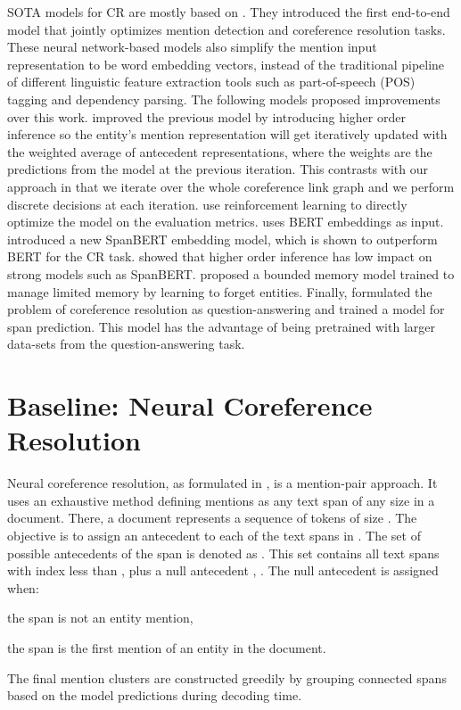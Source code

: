 \documentclass[11pt]{article}
\begin{document}
SOTA models for CR are mostly based on \citet{lee-etal-2017-end}. They introduced the first end-to-end model that jointly optimizes mention detection and coreference resolution tasks. These neural network-based models also simplify the mention input representation to be word embedding vectors, instead of the traditional pipeline of different linguistic feature extraction tools such as part-of-speech (POS) tagging and dependency parsing. The following models proposed improvements over this work.  \cite{lee-etal-2018-higher} improved the previous model by introducing higher order inference so the entity's mention representation will get iteratively updated with the weighted average of antecedent representations, where the weights are the predictions from the model at the previous iteration. This contrasts with our approach in that we iterate over the whole coreference link graph and we perform discrete decisions at each iteration. \citet{fei-etal-2019-end} use reinforcement learning to directly optimize the model on the evaluation metrics. \citet{joshi-etal-2019-bert} uses BERT embeddings \cite{devlin-etal-2019-bert} as input. \citet{joshi-etal-2020-spanbert} introduced a new SpanBERT embedding model, which is shown to outperform BERT for the CR task. \citet{xu-choi-2020-revealing} showed that higher order inference has low impact on strong models such as SpanBERT.  \citet{toshniwal-etal-2020-learning} proposed a bounded memory model trained to manage limited memory by learning to forget entities. Finally, \citet{wu-etal-2020-corefqa} formulated the problem of coreference resolution as question-answering and trained a model for span prediction. This model has the advantage of being pretrained with larger data-sets from the question-answering task.
 


\section{Baseline: Neural Coreference Resolution} 
\label{sec:coreference:base}

Neural coreference resolution, as formulated in \cite{lee-etal-2017-end, lee-etal-2018-higher}, is a mention-pair approach. It uses an exhaustive method defining mentions as any text span of any size in a document. There, a document   represents a sequence of tokens of size . The objective is to assign an antecedent  to each of the  text spans  in .  The set of possible antecedents of the span  is denoted as  . This set contains all text spans with index less than , plus a null antecedent , . The null antecedent is assigned when:
\begin{enumerate*}[(\alph*)]
	\item the span is not an entity mention,
	\item the span is the first mention of an entity in the document.
\end{enumerate*}
The final mention clusters are constructed greedily by grouping connected spans based on the model predictions during decoding time.
\end{document}
